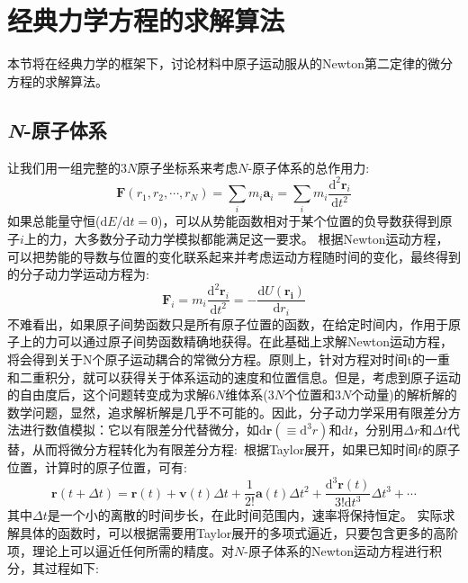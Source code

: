 \section{经典力学方程的求解算法}\label{section:MD_algorithm}
本节将在经典力学的框架下，讨论材料中原子运动服从的\textrm{Newton}第二定律的微分方程的求解算法。
\subsection{{\it N}-原子体系}
让我们用一组完整的$3N$原子坐标系来考虑$N$-原子体系的总作用力:
\begin{equation}
	\mathbf{F}(r_1,r_2,\cdots,r_N)=\sum_im_i\mathbf{a}_i=\sum_im_i\dfrac{\mathrm{d}^2\mathbf{r}_i}{\mathrm{d}t^2}
	\label{eq:MD_force}
\end{equation}
如果总能量守恒($\mathrm{d}E/\mathrm{d}t=0$)，可以从势能函数相对于某个位置的负导数获得到原子$i$上的力，大多数分子动力学模拟都能满足这一要求。%
根据\textrm{Newton}运动方程，可以把势能的导数与位置的变化联系起来并考虑运动方程随时间的变化，最终得到的分子动力学运动方程为:
\begin{equation}
	\mathbf{F}_i=m_i\dfrac{\mathrm{d}^2\mathbf{r}_i}{\mathrm{d}t^2}=-\dfrac{\mathrm{d}U(\mathbf{r_i})}{\mathrm{d}r_i}
	\label{eq:Forece_Potential}
\end{equation}
不难看出，如果原子间势函数只是所有原子位置的函数，在给定时间内，作用于原子上的力可以通过原子间势函数精确地获得。在此基础上求解\textrm{Newton}运动方程，将会得到关于N个原子运动耦合的常微分方程。原则上，针对方程对时间t的一重和二重积分，就可以获得关于体系运动的速度和位置信息。但是，考虑到原子运动的自由度后，这个问题转变成为求解$6N$维体系($3N$个位置和$3N$个动量)的解析解的数学问题，显然，追求解析解是几乎不可能的。因此，分子动力学采用有限差分方法进行数值模拟：它以有限差分代替微分，如$\mathrm{d}\mathbf{r}(\equiv\mathrm{d}^3r)$和$\mathrm{d}t$，分别用$\Delta r$和$\Delta t$代替，从而将微分方程转化为有限差分方程:~根据\textrm{Taylor}展开，如果已知时间$t$的原子位置，计算时的原子位置，可有:
\begin{equation}
	\mathbf{r}(t+\Delta t)=\mathbf{r}(t)+\mathbf{v}(t)\Delta t+\dfrac1{2!}\mathbf{a}(t)\Delta t^2+\dfrac{\mathrm{d}^3\mathbf{r}(t)}{3!\mathrm{d}t^3}\Delta t^3+\cdots
	\label{eq:displace}
\end{equation}
其中$\Delta t$是一个小的离散的时间步长，在此时间范围内，速率将保持恒定。
实际求解具体的函数时，可以根据需要用\textrm{Taylor}展开的多项式逼近，只要包含更多的高阶项，理论上可以逼近任何所需的精度。对$N$-原子体系的\textrm{Newton}运动方程进行积分，其过程如下:
